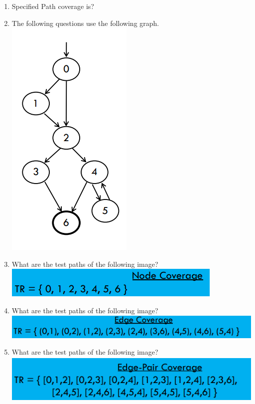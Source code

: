 \documentclass[10pt]{article}
\begin{document}
\begin{enumerate}
    \item Specified Path coverage is?\\
    \item The following questions use the following graph.\\
          \includegraphics*[scale=.5]{graph1.png}\\
    \item What are the test paths of the following image?\\
          \includegraphics*[scale=.5]{nodec.png}\\
    \item What are the test paths of the following image?\\
          \includegraphics*[scale=.5]{edgec.png}\\
    \item What are the test paths of the following image?\\
          \includegraphics*[scale=.5]{edgepc.png}\\



\end{enumerate}
\end{document}
